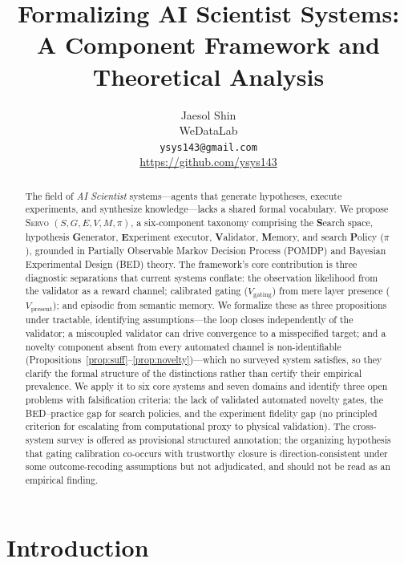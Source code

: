 \documentclass{article}
\title{\textbf{Formalizing AI Scientist Systems:\\
A Component Framework and Theoretical Analysis}}
\author{%
  Jaesol Shin \\
  WeDataLab \\
  \texttt{ysys143@gmail.com} \\
  \url{https://github.com/ysys143}
}
\date{}
\newcommand{\sgmvpi}{$(S, G, E, V, M, \pi)$}
\newcommand{\framework}{\textsc{Servo}}
\begin{document}
\providecommand{\nolinenumbers}{}%
\nolinenumbers

\maketitle

\begin{abstract}
The field of \emph{AI Scientist} systems---agents that generate hypotheses, execute experiments, and synthesize knowledge---lacks a shared formal vocabulary. We propose \framework{} \sgmvpi{}, a six-component taxonomy comprising the \textbf{S}earch space, hypothesis \textbf{G}enerator, \textbf{E}xperiment executor, \textbf{V}alidator, \textbf{M}emory, and search \textbf{P}olicy ($\pi$), grounded in Partially Observable Markov Decision Process (POMDP) and Bayesian Experimental Design (BED) theory. The framework's core contribution is three diagnostic separations that current systems conflate: the observation likelihood from the validator as a reward channel; calibrated gating ($V_\text{gating}$) from mere layer presence ($V_\text{present}$); and episodic from semantic memory. We formalize these as three propositions under tractable, identifying assumptions---the loop closes independently of the validator; a miscoupled validator can drive convergence to a misspecified target; and a novelty component absent from every automated channel is non-identifiable (Propositions~\ref{prop:suff}--\ref{prop:novelty})---which no surveyed system satisfies, so they clarify the formal structure of the distinctions rather than certify their empirical prevalence. We apply it to six core systems and seven domains and identify three open problems with falsification criteria: the lack of validated automated novelty gates, the BED--practice gap for search policies, and the experiment fidelity gap (no principled criterion for escalating from computational proxy to physical validation). The cross-system survey is offered as provisional structured annotation; the organizing hypothesis that gating calibration co-occurs with trustworthy closure is direction-consistent under some outcome-recoding assumptions but not adjudicated, and should not be read as an empirical finding.
\end{abstract}

\section{Introduction}
\end{document}
